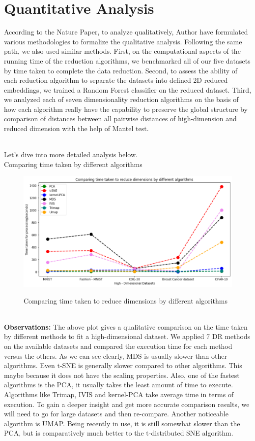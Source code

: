 \documentclass[letterpaper, 10 pt, conference]{ieeeconf}  %
\begin{document}
\section{Quantitative Analysis}
According to the Nature Paper, to analyze qualitatively, Author have formulated various methodologies to formalize the qualitative analysis. Following the same path, we also used similar methods. First, on the computational aspects of the running time of the reduction algorithms, we benchmarked all of our five datasets by time taken to complete the data reduction. Second, to assess the ability of each reduction algorithm to separate the datasets into defined 2D reduced embeddings, we trained a Random Forest classifier on the reduced dataset. Third, we analyzed each of seven dimensionality reduction algorithms on the basis of how each algorithm really have the capability to preserve the global structure by comparison of distances between all pairwise distances of high-dimension and reduced dimension with the help of Mantel test.

\\Let’s dive into more detailed analysis below.
\\Comparing time taken by different algorithms
\begin{figure}[h!]
	\centering
	\includegraphics[width=0.94\linewidth]{qual1.png}
	\label{fig:qual1}
	\caption{Comparing time taken to reduce dimensions by different algorithms}
\end{figure}
\vspace{3mm}
\\\textbf{Observations:}
The above plot gives a qualitative comparison on the time taken by different methods to fit a high-dimensional dataset. We applied 7 DR methods on the available datasets and compared the execution time for each method versus the others. As we can see clearly, MDS is usually slower than other algorithms. Even t-SNE is generally slower compared to other algorithms. This maybe because it does not have the scaling properties. Also, one of the fastest algorithms is the PCA, it usually takes the least amount of time to execute. Algorithms like Trimap, IVIS and kernel-PCA take average time in terms of execution. To gain a deeper insight and get more accurate comparison results, we will need to go for large datasets and then re-compare. Another noticeable algorithm is UMAP. Being recently in use, it is still somewhat slower than the PCA, but is comparatively much better to the t-distributed SNE algorithm.
\end{document}
